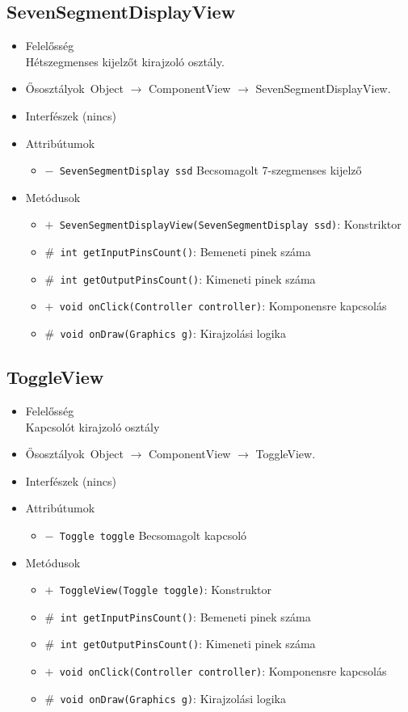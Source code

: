 \subsection{SevenSegmentDisplayView}
\begin{itemize}
\item Felelősség\\
Hétszegmenses kijelzőt kirajzoló osztály.
\item Ősosztályok\ Object $\rightarrow{}$ ComponentView $\rightarrow{}$ SevenSegmentDisplayView.
\item Interfészek (nincs)
\item Attribútumok $\ $
\begin{itemize}
	\item[] \texttt{$-$ SevenSegmentDisplay ssd} Becsomagolt 7-szegmenses kijelző
\end{itemize}
\item Metódusok$\ $
\begin{itemize}
	\item[] \texttt{$+$ SevenSegmentDisplayView(SevenSegmentDisplay ssd)}: Konstriktor
	\item[] \texttt{$\#$ int getInputPinsCount()}: Bemeneti pinek száma
	\item[] \texttt{$\#$ int getOutputPinsCount()}: Kimeneti pinek száma
	\item[] \texttt{$+$ void onClick(Controller controller)}: Komponensre kapcsolás
	\item[] \texttt{$\#$ void onDraw(Graphics g)}: Kirajzolási logika
\end{itemize}
\end{itemize}

\subsection{ToggleView}
\begin{itemize}
\item Felelősség\\
Kapcsolót kirajzoló osztály
\item Ősosztályok\ Object $\rightarrow{}$ ComponentView $\rightarrow{}$ ToggleView.
\item Interfészek (nincs)
\item Attribútumok $\ $
\begin{itemize}
	\item[] \texttt{$-$ Toggle toggle} Becsomagolt kapcsoló
\end{itemize}
\item Metódusok$\ $
\begin{itemize}
	\item[] \texttt{$+$ ToggleView(Toggle toggle)}: Konstruktor
	\item[] \texttt{$\#$ int getInputPinsCount()}: Bemeneti pinek száma
	\item[] \texttt{$\#$ int getOutputPinsCount()}: Kimeneti pinek száma
	\item[] \texttt{$+$ void onClick(Controller controller)}: Komponensre kapcsolás
	\item[] \texttt{$\#$ void onDraw(Graphics g)}: Kirajzolási logika
\end{itemize}
\end{itemize}


